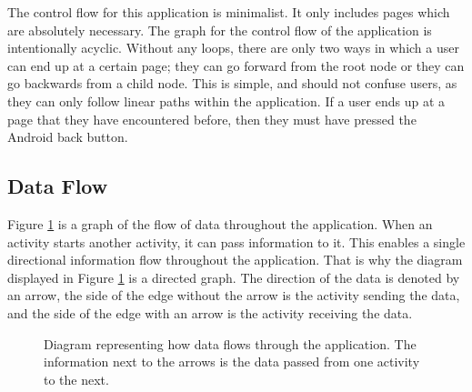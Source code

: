 \documentclass{article}
\begin{document}
The control flow for this application is minimalist. It only includes pages which are absolutely necessary. The graph for the control flow of the application is intentionally acyclic. Without any loops, there are only two ways in which a user can end up at a certain page; they can go forward from the root node or they can go backwards from a child node. This is simple, and should not confuse users, as they can only follow linear paths within the application. If a user ends up at a page that they have encountered before, then they must have pressed the Android back button. \par

\subsection{Data Flow}

Figure \ref{figure:applicationDataFlow} is a graph of the flow of data throughout the application. When an activity starts another activity, it can pass information to it. This enables a single directional information flow throughout the application. That is why the diagram displayed in Figure \ref{figure:applicationDataFlow} is a directed graph. The direction of the data is denoted by an arrow, the side of the edge without the arrow is the activity sending the data, and the side of the edge with an arrow is the activity receiving the data. 

\begin{figure}[H]
	\centering
	\caption{Diagram representing how data flows through the application. The information next to the arrows is the data passed from one activity to the next.}
	\label{figure:applicationDataFlow}
\end{figure}
\end{document}
